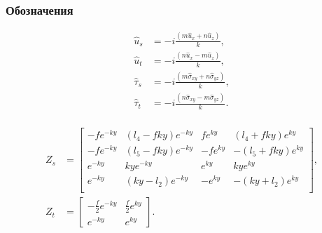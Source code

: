 \begin{frame}
    \frametitle{Обозначения}
    \begin{equation}
        \label{eq:FT_special_variables}
        \begin{split}
            \hat{u}_s & = -i \frac{(m\hat{u}_x + n\hat{u}_z)}{k}, \\
            \hat{u}_t & = -i \frac{(n\hat{u}_x - m\hat{u}_z)}{k}, \\
            \hat{\tau}_s & = -i \frac{(m\hat{\sigma}_{xy} + n\hat{\sigma}_{yz})}{k}, \\
            \hat{\tau}_t & = -i \frac{(n\hat{\sigma}_{xy} - m\hat{\sigma}_{yz})}{k}. \\
        \end{split} 
    \end{equation}

    \begin{equation}
        \begin{split}
        Z_s & = 
        \left[
        \begin{array}{cccc}
            -fe^{-ky} & (l_4-fky)e^{-ky} & fe^{ky} & (l_4+fky)e^{ky} \\
            -fe^{-ky} & (l_5-fky)e^{-ky} & -fe^{ky} & -(l_5+fky)e^{ky} \\
            e^{-ky} & kye^{-ky} & e^{ky} & kye^{ky} \\
            e^{-ky} & (ky-l_2)e^{-ky} & -e^{ky} & -(ky+l_2)e^{ky} \\
        \end{array}
        \right],
        \\
        Z_t & = 
        \left[
        \begin{array}{cc}
            -\frac{f}{2}e^{-ky} & \frac{f}{2}e^{ky} \\
            e^{-ky} & e^{ky}
        \end{array}
        \right].
        \end{split}
    \end{equation}
\end{frame}

